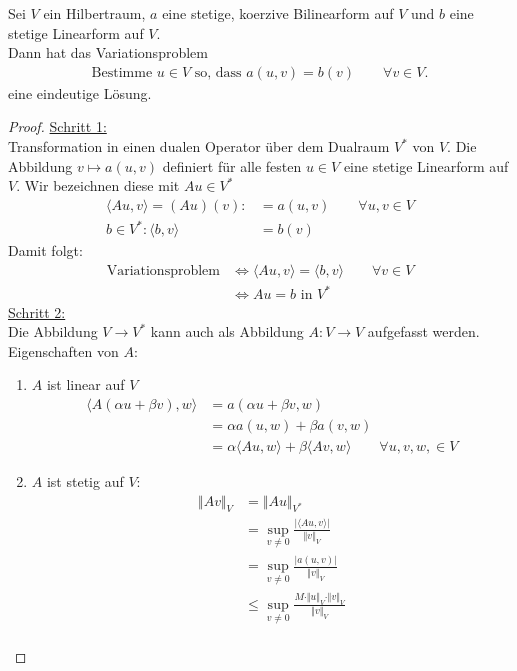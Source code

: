 \begin{theorem}\label{theorem2.1LaxMilgram}\enter
Sei $V$ ein Hilbertraum, $a$ eine stetige, koerzive Bilinearform auf $V$ und $b$ eine stetige Linearform auf $V$.\\
Dann hat das Variationsproblem
\begin{align*}
\text{Bestimme $u\in V$ so, dass }a(u,v)=b(v)\qquad\forall v\in V.
\end{align*}
eine eindeutige Lösung.
\end{theorem}
\begin{proof}
\underline{Schritt 1:}\\ Transformation in einen dualen Operator über dem Dualraum $V^\ast$ von $V$. Die Abbildung $v\mapsto a(u,v)$ definiert für alle festen $u\in V$ eine stetige Linearform auf $V$. Wir bezeichnen diese mit $Au\in V^\ast$
\begin{align*}
	\langle Au,v\rangle=(Au)(v):&=a(u,v)\qquad\forall u,v\in V \\
	b\in V^\ast: \langle b,v\rangle&=b(v)
\end{align*}
Damit folgt:
\begin{align*}
\text{Variationsproblem}&\Longleftrightarrow\langle Au,v\rangle=\langle b,v\rangle\qquad\forall v\in V\\
&\Longleftrightarrow Au=b\text{ in }V^\ast
\end{align*}
\underline{Schritt 2:}\\
Die Abbildung $V\to V^\ast$ kann auch als Abbildung $A:V\to V$ aufgefasst werden. Eigenschaften von $A$:
\begin{enumerate}[label=(\alph*)]
\item $A$ ist linear auf $V$
\begin{align*}
\big\langle A(\alpha u+\beta v),w\big\rangle
&=a(\alpha u+\beta v,w)\\
&=\alpha a(u,w)+\beta a(v,w)\\
&=\alpha\langle Au,w\rangle+\beta\langle Av,w\rangle\qquad\forall u,v,w,\in V
\end{align*}
\item $A$ ist stetig auf $V$:
\begin{align*}
\Vert A v\Vert_{V}
&=\Vert A u\Vert_{V^\ast}\\
&=\sup\limits_{v\neq0}\frac{\big|\langle Au,v\rangle\big|}{\Vert v\Vert_V}\\
&=\sup\limits_{v\neq0}\frac{\big|a(u,v)\big|}{\Vert v\Vert_V}\\
&\leq
\sup\limits_{v\neq0}\frac{M\cdot\Vert u\Vert_V\cdot\Vert v\Vert_V}{\Vert v\Vert_V}\\

\end{align*}
\end{enumerate}
\end{proof}
